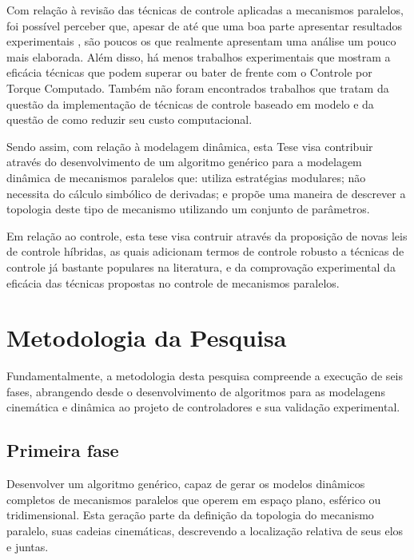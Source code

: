 \documentclass[]{politex}
\begin{document}
Com relação à revisão das técnicas de controle aplicadas a mecanismos paralelos, foi possível perceber que, apesar de até que uma boa parte apresentar resultados experimentais \cite{Honegger, Cheng, Shang, Yen, Codourey, Vivas, Duchaine, Chemori, Begon}, são poucos os que realmente apresentam uma análise um pouco mais elaborada. Além disso, há menos trabalhos experimentais que mostram a eficácia  técnicas que podem superar ou bater de frente com o Controle por Torque Computado. Também não foram encontrados trabalhos que tratam da questão da implementação de técnicas de controle baseado em modelo e da questão de como reduzir seu custo computacional.

Sendo assim, com relação à modelagem dinâmica, esta Tese visa contribuir através do desenvolvimento de um algoritmo genérico para a modelagem dinâmica de mecanismos paralelos que: utiliza estratégias modulares; não necessita do cálculo simbólico de derivadas; e propõe uma maneira de descrever a topologia deste tipo de mecanismo utilizando um conjunto de parâmetros.

Em relação ao controle, esta tese visa contruir através da proposição de novas leis de controle híbridas, as quais adicionam termos de controle robusto a técnicas de controle já bastante populares na literatura, e da comprovação experimental da eficácia das técnicas propostas no controle de mecanismos paralelos.

\chapter{Metodologia da Pesquisa}\label{method}

Fundamentalmente, a metodologia desta pesquisa compreende a execução de seis fases, abrangendo desde o desenvolvimento de algoritmos para as modelagens cinemática e dinâmica ao projeto de controladores e sua validação experimental.

\section{Primeira fase} 
Desenvolver um algoritmo genérico, capaz de gerar os modelos dinâmicos completos de mecanismos paralelos que operem em espaço plano, esférico ou tridimensional. Esta geração parte da definição da topologia do mecanismo paralelo, suas cadeias cinemáticas, descrevendo a localização relativa de seus elos e juntas. 
\end{document}
